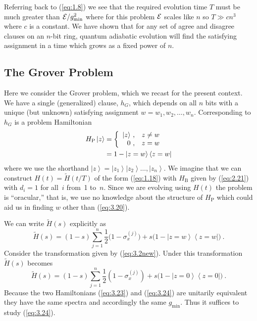 \documentclass[twoside]{article}
\makeatletter
\newcommand{\half}{{\textstyle{\frac12}}}
\newcommand{\ket}[1]{\left|#1\right\rangle}
\newcommand{\bra}[1]{\left\langle#1\right|}
\newcommand{\numEq}[2]{\begin{equation}
   \label{eq:#1}
   #2\end{equation}}
\newcommand{\refEq}[1]{(\ref{eq:#1})}
\newcommand{\citeRef}[1]{\thinspace\cite{ref:#1}}
\newcommand{\rP}{{\mathrm{P}}}
\newcommand{\rB}{{\mathrm{B}}}
\newcommand{\gm}{g_{\min}}
\let\tilde\widetilde
\newcommand{\Cases}[1]{\left\{ 
  \begin{array}{r@{\ ,}@{\quad}l}
  #1
  \end{array}\right.}
\numberwithin{equation}{section}
\makeatother
\begin{document}
Referring back to \refEq{1.8} we see that the required evolution time $T$
must be much greater than ${\cal E}/\gm^2$ where for this problem ${\cal
E}$ scales like $n$ so $T \gg cn^3$ where $c$ is a constant.  We have shown
that for any set of agree and disagree clauses on an $n$-bit ring, quantum
adiabatic evolution will find the satisfying assignment in a time which
grows as a fixed power of $n$.

\subsection{The Grover Problem}
\label{sec:grover} Here we consider the Grover problem\citeRef1, which
we recast for the present context.  We have a single (generalized) clause,
$h_G$, which depends on all
$n$ bits with a unique (but unknown) satisfying assignment $w=w_1,w_2,
\dots,w_n$.  Corresponding to $h_G$ is a problem Hamiltonian
\begin{align} H_\rP \ket z &= \Cases{\ket z & z \ne w \\ 0 & z=w} 
\nonumber \\ &= 1- \ket{z=w} \bra{z=w}
\label{eq:3.20}
\end{align} where we use the shorthand  $\ket z = \ket {z_1} \ket
{z_2}\dots,\ket {z_n}$. We imagine that we can construct $H(t) = \tilde H
(t/T)$ of the form
\refEq{1.18} with $H_\rB$ given by \refEq{2.21} with $d_i=1$ for all~$i$
from~1 to~$n$.  Since we are evolving using $H(t)$ the problem is
``oracular,'' that is, we use no knowledge about the structure of $H_\rP$
which could aid us in finding $w$ other than (\ref{eq:3.20}).

We can write $\tilde H(s)$ explicitly as
\numEq{3.23}{
\tilde H(s) = (1-s) \sum^n_{j=1} \half \bigl(1 - \sigma_x^{(j)}\bigr) + s
\bigl(1 -
\ket{z=w} \bra{z=w}\bigr)  \ . } Consider the transformation given by
\refEq{3.2new}.  Under this transformation
$\tilde H(s)$ becomes
\numEq{3.24}{
\tilde H(s) = (1-s) \sum^n_{j=1} \half (1 - \sigma_x^{(j)}) + s \bigl(1 -
\ket{z=0} \bra{z=0}\bigr) \ . } Because the two Hamiltonians \refEq{3.23}
and \refEq{3.24} are unitarily equivalent they have the same spectra and
accordingly the same $\gm$.  Thus it suffices to study \refEq{3.24}.
\end{document}
